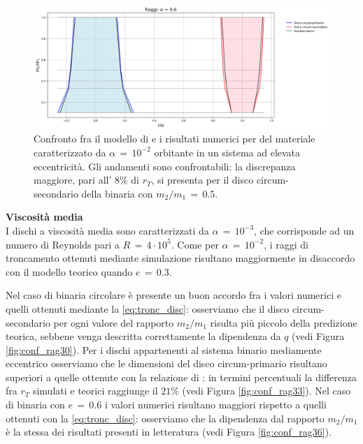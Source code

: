 \begin{figure}[H]
  \centering
  \includegraphics[width=\textwidth]{Immagini/Confronto/conrag_A2_e6.png}
  \caption{Confronto fra il modello di \textcite{ManaraTronc2019} e i risultati numerici per del materiale caratterizzato da $\alpha\,=\,10^{-2}$ orbitante in un sistema ad elevata eccentricità. Gli andamenti sono confrontabili: la discrepanza maggiore, pari all' $8\%$ di $r_T$, si presenta per il disco circum-secondario della binaria con $m_2/m_1\,=\,0.5$.}
  \label{fig:conf_rag26}
\end{figure}

\newpage
\textbf{Viscosità media}\\

I dischi a viscosità media sono caratterizzati da $\alpha\,=\,10^{-3}$, che corrisponde ad un numero di Reynolds pari a $R\,=\,4 \cdot 10^5$.
Come per $\alpha\,=\,10^{-2}$, i raggi di troncamento ottenuti mediante simulazione risultano maggiormente in disaccordo con il modello teorico quando $e\,=\,0.3$.

Nel caso di binaria circolare è presente un buon accordo fra i valori numerici e quelli ottenuti mediante la \eqref{eq:tronc_disc}: osserviamo che il disco circum-secondario per ogni valore del rapporto $m_2/m_1$ risulta più piccolo della predizione teorica, sebbene venga descritta correttamente la dipendenza da $q$ (vedi Figura \ref{fig:conf_rag30}).
Per i dischi appartenenti al sistema binario mediamente eccentrico osserviamo che le dimensioni del disco circum-primario risultano superiori a quelle ottenute con la relazione di \textcite{ManaraTronc2019}: in termini percentuali la differenza fra $r_T$ simulati e teorici raggiunge il $21\%$ (vedi Figura \ref{fig:conf_rag33}).
Nel caso di binaria con $e\,=\,0.6$ i valori numerici risultano maggiori rispetto a quelli ottenuti con la \eqref{eq:tronc_disc}: osserviamo che la dipendenza dal rapporto $m_2/m_1$ è la stessa dei risultati presenti in letteratura (vedi Figura \ref{fig:conf_rag36}).


